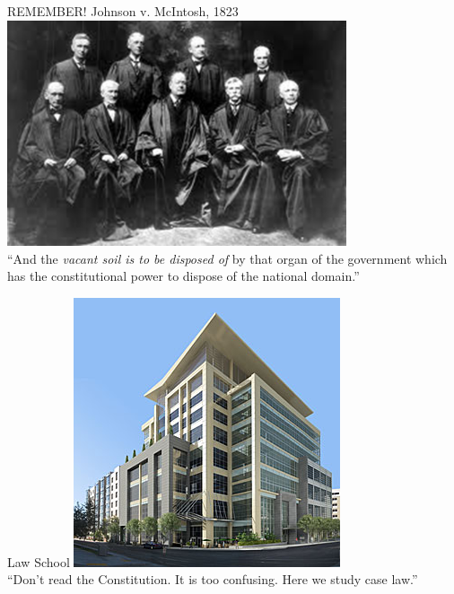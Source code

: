 \begin{frame}{REMEMBER! Johnson v. McIntosh, 1823}
    \centering
    \includegraphics[width=0.75\textwidth]{img/sc-1905.png} \\
    ``And the \emph{vacant soil is to be disposed of} by that organ of the government which has the constitutional power to dispose of the national domain.'' \\
\end{frame}

\begin{frame}{Law School}
    \centering
    \includegraphics[height=.7\textheight]{img/law-school.png} \\
    \pause
    \large{``Don't read the Constitution. It is too confusing. Here we study case law.''}
\end{frame}

